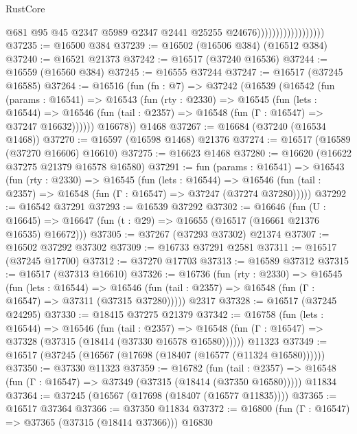 \begin{lexlean}{RustCore}
\begin{coremodule}
                                        @681
                                        @95
                                        @45
                                        @2347
                                        @5989
                                        @2347
                                        @2441
                                        @25255
                                        @24676))))))))))))))))))
@37235 := @16500 @384
@37239 := @16502 (@16506 @384) (@16512 @384)
@37240 := @16521 @21373
@37242 := @16517 (@37240 @16536)
@37244 := @16559 (@16560 @384)
@37245 := @16555 @37244
@37247 := @16517 (@37245 @16585)
@37264 := @16516
    (fun (fn : @7) =>
    @37242
      (@16539
        (@16542
          (fun (params : @16541) =>
          @16543
            (fun (rty : @2330) =>
            @16545
              (fun (lets : @16544) =>
              @16546 (fun (tail : @2357) => @16548 (fun (Γ : @16547) => @37247 @16632))))))
        @16678))
    @1468
@37267 := @16684 (@37240 (@16534 @1468))
@37270 := @16597 (@16598 @1468) @21376
@37274 := @16517 (@16589 (@37270 @16606) @16610)
@37275 := @16623 @1468
@37280 := @16620 (@16622 @37275 @21379 @16578 @16580)
@37291 := fun (params : @16541) =>
  @16543
    (fun (rty : @2330) =>
    @16545
      (fun (lets : @16544) =>
      @16546 (fun (tail : @2357) => @16548 (fun (Γ : @16547) => @37247 (@37274 @37280)))))
@37292 := @16542 @37291
@37293 := @16539 @37292
@37302 := @16646
    (fun (U : @16645) => @16647 (fun (t : @29) => @16655 (@16517 (@16661 @21376 @16535) @16672)))
@37305 := @37267 (@37293 @37302) @21374
@37307 := @16502 @37292 @37302
@37309 := @16733 @37291 @2581
@37311 := @16517 (@37245 @17700)
@37312 := @37270 @17703
@37313 := @16589 @37312
@37315 := @16517 (@37313 @16610)
@37326 := @16736
    (fun (rty : @2330) =>
    @16545
      (fun (lets : @16544) =>
      @16546 (fun (tail : @2357) => @16548 (fun (Γ : @16547) => @37311 (@37315 @37280)))))
    @2317
@37328 := @16517 (@37245 @24295)
@37330 := @18415 @37275 @21379
@37342 := @16758
    (fun (lets : @16544) =>
    @16546
      (fun (tail : @2357) =>
      @16548 (fun (Γ : @16547) => @37328 (@37315 (@18414 (@37330 @16578 @16580))))))
    @11323
@37349 := @16517 (@37245 (@16567 (@17698 (@18407 (@16577 (@11324 @16580))))))
@37350 := @37330 @11323
@37359 := @16782
    (fun (tail : @2357) => @16548 (fun (Γ : @16547) => @37349 (@37315 (@18414 (@37350 @16580)))))
    @11834
@37364 := @37245 (@16567 (@17698 (@18407 (@16577 @11835))))
@37365 := @16517 @37364
@37366 := @37350 @11834
@37372 := @16800 (fun (Γ : @16547) => @37365 (@37315 (@18414 @37366))) @16830

\end{coremodule}
\end{lexlean}
